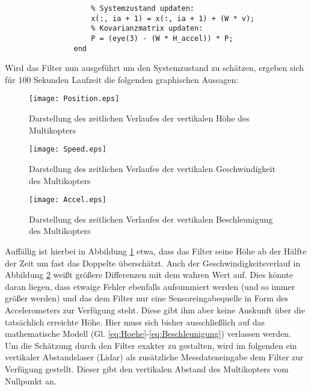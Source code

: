 \documentclass[12pt,a4paper]{article}
\begin{document}
\begin{enumerate}[label=\textbf{\arabic*})]
\begin{enumerate}[label=\textbf{\alph*})]
\begin{lstlisting}
					% Systemzustand updaten:
					x(:, ia + 1) = x(:, ia + 1) + (W * v);
					% Kovarianzmatrix updaten:
					P = (eye(3) - (W * H_accel)) * P;
				end
			\end{lstlisting}
			Wird das Filter nun ausgeführt um den Systemzustand zu schätzen, ergeben sich für 100 Sekunden Laufzeit die folgenden graphischen Aussagen:\\
			\begin{figure}[h]
				\centering
				\texttt{[image: Position.eps]}
				\caption{\label{fig:KalmanHoehe}Darstellung des zeitlichen Verlaufes der vertikalen Höhe des Multikopters}
			\end{figure}
			\begin{figure}[h]
				\centering
				\texttt{[image: Speed.eps]}
				\caption{\label{fig:KalmanGeschwindigkeit}Darstellung des zeitlichen Verlaufes der vertikalen Geschwindigkeit des Multikopters}
			\end{figure}
			\begin{figure}[h]
				\centering
				\texttt{[image: Accel.eps]}
				\caption{\label{fig:KalmanBeschleunigung}Darstellung des zeitlichen Verlaufes der vertikalen Beschleunigung des Multikopters}
			\end{figure}
		
		Auffällig ist hierbei in Abbildung \ref{fig:KalmanHoehe} etwa, dass das Filter seine Höhe ab der Hälfte der Zeit um fast das Doppelte überschätzt. Auch der Geschwindigkeitsverlauf in Abbildung \ref{fig:KalmanGeschwindigkeit} weißt größere Differenzen mit dem wahren Wert auf. Dies könnte daran liegen, dass etwaige Fehler ebenfalls aufsummiert werden (und so immer größer werden) und das dem Filter nur eine Sensoreingabequelle in Form des Accelerometers zur Verfügung steht. Diese gibt ihm aber keine Auskunft über die tatsächlich erreichte Höhe. Hier muss sich bisher ausschließlich auf das mathematische Modell (Gl. \ref{eq:Hoehe}-\ref{eq:Beschleunigung}) verlassen werden.\\
		
		Um die Schätzung durch den Filter exakter zu gestalten, wird im folgenden ein vertikaler Abstandslaser (Lidar) als zusätzliche Messdateneingabe dem Filter zur Verfügung gestellt. Dieser gibt den vertikalen Abstand des Multikopters vom Nullpunkt an.\\
		

\end{enumerate}
\end{enumerate}
\end{document}
